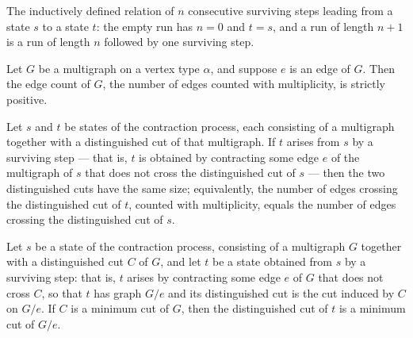 \begin{definition}
\label{KargerTrace.SurvivingRun}
\leanok
{}
The inductively defined relation of $n$ consecutive surviving steps leading from a state
$s$ to a state $t$: the empty run has $n = 0$ and $t = s$, and a run of length $n+1$ is a
run of length $n$ followed by one surviving step.
\end{definition}

\begin{lemma}
\label{KargerTrace.edgeCount_pos_of_mem}
\leanok
{}
Let $G$ be a multigraph on a vertex type $\alpha$, and suppose $e$ is an edge of $G$.
Then the edge count of $G$, the number of edges counted with multiplicity, is strictly
positive.
\end{lemma}

\begin{lemma}
\label{KargerTrace.survivingStep_cut_size_eq}
\leanok
{}
Let $s$ and $t$ be states of the contraction process, each consisting of a multigraph
together with a distinguished cut of that multigraph. If $t$ arises from $s$ by a
surviving step — that is, $t$ is obtained by contracting some edge $e$ of the multigraph
of $s$ that does not cross the distinguished cut of $s$ — then the two distinguished
cuts have the same size; equivalently, the number of edges crossing the distinguished
cut of $t$, counted with multiplicity, equals the number of edges crossing the
distinguished cut of $s$.
\end{lemma}

\begin{lemma}
\label{KargerTrace.survivingStep_mincut}
\leanok
{}
Let $s$ be a state of the contraction process, consisting of a multigraph $G$ together
with a distinguished cut $C$ of $G$, and let $t$ be a state obtained from $s$ by a
surviving step: that is, $t$ arises by contracting some edge $e$ of $G$ that does not
cross $C$, so that $t$ has graph $G/e$ and its distinguished cut is the cut induced by
$C$ on $G/e$. If $C$ is a minimum cut of $G$, then the distinguished cut of $t$ is a
minimum cut of $G/e$.
\end{lemma}

